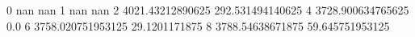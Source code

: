 0 nan nan
1 nan nan
2 4021.43212890625 292.531494140625
4 3728.900634765625 0.0
6 3758.020751953125 29.1201171875
8 3788.54638671875 59.645751953125

